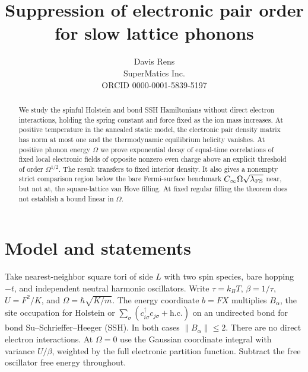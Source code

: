 \documentclass[11pt]{article}
\title{Suppression of electronic pair order for slow lattice phonons}
\author{Davis Rens\\SuperMatics Inc.\\ORCID 0000-0001-5839-5197}
\date{}
\begin{document}
\maketitle
\begin{abstract}
We study the spinful Holstein and bond SSH Hamiltonians without direct electron interactions, holding the spring constant and force fixed as the ion mass increases. At positive temperature in the annealed static model, the electronic pair density matrix has norm at most one and the thermodynamic equilibrium helicity vanishes. At positive phonon energy $\Omega$ we prove exponential decay of equal-time correlations of fixed local electronic fields of opposite nonzero even charge above an explicit threshold of order $\Omega^{1/2}$. The result transfers to fixed interior density. It also gives a nonempty strict comparison region below the bare Fermi-surface benchmark $C_\infty\Omega\sqrt{\lambda_{\rm FS}}$ near, but not at, the square-lattice van Hove filling. At fixed regular filling the theorem does not establish a bound linear in $\Omega$.
\end{abstract}

\section{Model and statements}
Take nearest-neighbor square tori of side $L$ with two spin species, bare hopping $-t$, and independent neutral harmonic oscillators. Write $\tau=k_BT$, $\beta=1/\tau$, $U=F^2/K$, and $\Omega=\hbar\sqrt{K/m}$. The energy coordinate $b=FX$ multiplies $B_\alpha$, the site occupation for Holstein or $\sum_\sigma(c_{i\sigma}^\dagger c_{j\sigma}+\mathrm{h.c.})$ on an undirected bond for bond Su--Schrieffer--Heeger (SSH). In both cases $\|B_\alpha\|\le2$. There are no direct electron interactions. At $\Omega=0$ use the Gaussian coordinate integral with variance $U/\beta$, weighted by the full electronic partition function. Subtract the free oscillator free energy throughout.
\end{document}
